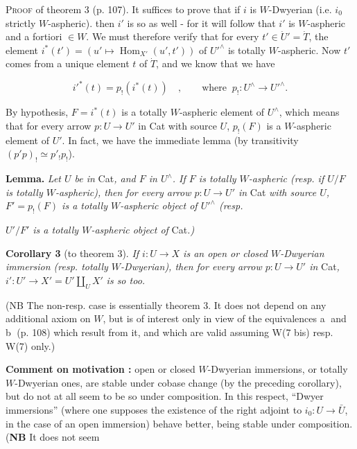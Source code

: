 \textsc{Proof} of theorem 3 (p. 107). It suffices to prove that if $i$ is $W$-Dwyerian (i.e. $i_0$ strictly $W$-aspheric). then $i'$ is so as well - for it will follow that $i'$ is $W$-aspheric and a fortiori $\in W$. We must therefore verify that for every $t'\in\dot{U}'=\dot{T}$, the element $i^*(t')=(u'\longmapsto\operatorname{Hom}_{X'}(u',t'))$ of $U'^\wedge$ is totally $W$-aspheric. Now $t'$ comes from a unique element $t$ of $\dot{T}$, and we know that we have %

\[ i'^*(t)=p_!(i^*(t))\quad,\qquad\text{where }\ p_!:U^\wedge\longrightarrow U'^\wedge. \]

By hypothesis, $F=i^*(t)$ is a totally $W$-aspheric element of $U^\wedge$, which means that for every arrow $p:U\longrightarrow U'$ in Cat with source $U$, $p_!(F)$ is a $W$-aspheric element of $U'$. In fact, we have the immediate lemma (by transitivity $(p'p)_!\simeq p'_!p_!$). %

\textbf{Lemma.} \textit{Let $U$ be in} Cat\textit{, and $F$ in $U^\wedge$. If $F$ is totally $W$-aspheric (resp. if $U/F$ is totally $W$-aspheric), then for every arrow $p:U\longrightarrow U'$ in} Cat \textit{with source $U$, $F'=p_!(F)$ is a totally $W$-aspheric object of $U'^\wedge$ (resp.}


\textit{$U'/F'$ is a totally $W$-aspheric object of} Cat\textit{.)}

\textbf{Corollary 3} (to theorem 3). \textit{If $i:U\longrightarrow X$ is an open or closed $W$-Dwyerian immersion (resp. totally $W$-Dwyerian), then for every arrow $p:U\longrightarrow U'$ in} Cat\textit{, $i':U'\longrightarrow X'=U'\amalg_U X'$} \textit{is so too.}

(NB The non-resp. case is essentially theorem 3. It does not depend on any additional axiom on $W$, but is of interest only in view of the equivalences \textcircled{a} and \textcircled{b} (p. 108) which result from it, and which are valid assuming W(7 bis) resp. W(7) only.)

\textbf{Comment on motivation :} open or closed $W$-Dwyerian immersions, or totally $W$-Dwyerian ones, are stable under cobase change (by the preceding corollary), but do not at all seem to be so under composition. In this respect, ``Dwyer immersions'' (where one supposes the existence of the right adjoint to $i_0:U\longrightarrow\bar{U}$, in the case of an open immersion) behave better, being stable under composition. (\textbf{NB} It does not seem

